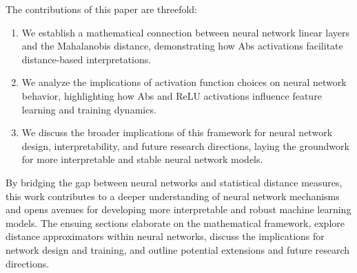 The contributions of this paper are threefold:
\begin{enumerate}
    \item We establish a mathematical connection between neural network linear layers and the Mahalanobis distance, demonstrating how Abs activations facilitate distance-based interpretations.
    \item We analyze the implications of activation function choices on neural network behavior, highlighting how Abs and ReLU activations influence feature learning and training dynamics.
    \item We discuss the broader implications of this framework for neural network design, interpretability, and future research directions, laying the groundwork for more interpretable and stable neural network models.
\end{enumerate}

By bridging the gap between neural networks and statistical distance measures, this work contributes to a deeper understanding of neural network mechanisms and opens avenues for developing more interpretable and robust machine learning models. The ensuing sections elaborate on the mathematical framework, explore distance approximators within neural networks, discuss the implications for network design and training, and outline potential extensions and future research directions.

